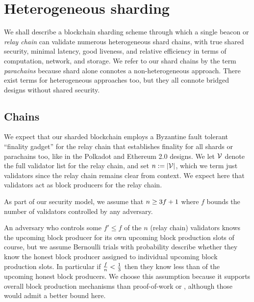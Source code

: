 \section{Heterogeneous sharding}

We shall describe a blockchain sharding scheme through which a single beacon or {\em relay chain} can validate numerous heterogeneous shard chains, with true shared security, minimal latency, good liveness, and relative efficiency in terms of computation, network, and storage.  We refer to our shard chains by the term {\em parachains} because shard alone connotes a non-heterogeneous approach.  There exist terms for heterogeneous approaches too, but they all connote bridged designs without shared security.  

\subsection{Chains}

We expect that our sharded blockchain employs a Byzantine fault tolerant ``finality gadget'' for the relay chain that establishes finality for all shards or parachains too, like in the Polkadot and Ethereum 2.0 designs.  We let $\mathcal{V}$ denote the full validator list for the relay chain, and set $n := |\mathcal{V}|$, which we term just validators since the relay chain remains clear from context.  We expect here that validators act as block producers for the relay chain.  

As part of our security model, we assume that $n \ge 3 f + 1$ where $f$ bounds the number of validators controlled by any adversary.

An adversary who controls some $f' \le f$ of the $n$ (relay chain) validators knows the upcoming block producer for its own upcoming block production slots of course, but we assume Bernoulli trials with probability  describe whether they know the honest block producer assigned to individual upcoming block production slots.  In particular if ${f \over n} < {1\over3}$ then they know less than  of the upcoming honest block producers.
We choose this assumption because it supports overall  block production mechanisms than proof-of-work or \cite{Praos}, although those would admit a better bound here. 

